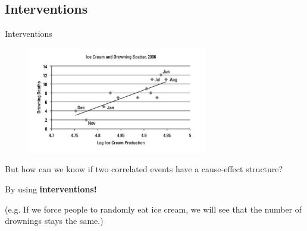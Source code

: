 \subsection{Interventions}
\begin{frame}{Interventions}
    \begin{figure}[t]
        \centering
        \vspace{0pt}
        \includegraphics[width=0.7\textwidth]{img/hidden_con.png}
    \end{figure}
    But how can we know if two correlated events have a cause-effect structure? 
    \pause

    By using \textbf{interventions!}

    (e.g. If we force people to randomly eat ice cream, we will see that the number of drownings stays the same.)
\end{frame}
    